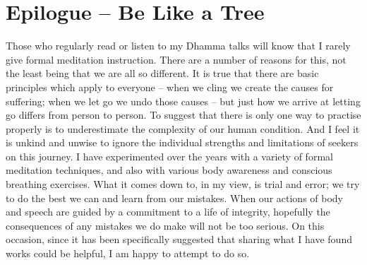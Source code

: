 

\chapter{Epilogue -- Be Like a Tree}


Those who regularly read or listen to my Dhamma talks will know that I
rarely give formal meditation instruction. There are a number of reasons
for this, not the least being that we are all so different. It is true
that there are basic principles which apply to everyone – when we cling
we create the causes for suffering; when we let go we undo those causes
– but just how we arrive at letting go differs from person to person. To
suggest that there is only one way to practise properly is to
underestimate the complexity of our human condition. And I feel it is
unkind and unwise to ignore the individual strengths and limitations of
seekers on this journey. I have experimented over the years with a
variety of formal meditation techniques, and also with various body
awareness and conscious breathing exercises. What it comes down to, in
my view, is trial and error; we try to do the best we can and learn from
our mistakes. When our actions of body and speech are guided by a
commitment to a life of integrity, hopefully the consequences of any
mistakes we do make will not be too serious. On this occasion, since it
has been specifically suggested that sharing what I have found works
could be helpful, I am happy to attempt to do so.

